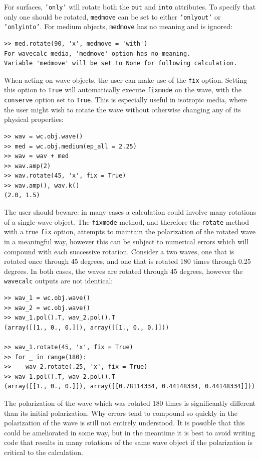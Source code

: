 \documentclass[11pt, reqno]{book}%
\newcounter{ct}
\newcommand{\tw}[1]{{\tt #1}}
\begin{document}
\noindent For surfaces, \tw{'only'} will rotate both the \tw{out} and \tw{into} attributes. To specify that only one should be rotated, \tw{medmove} can be set to either \tw{'onlyout'} or \tw{'onlyinto'}. For medium objects, \tw{medmove} has no meaning and is ignored:
\begin{verbatim}
>> med.rotate(90, 'x', medmove = 'with')
For wavecalc media, 'medmove' option has no meaning. 
Variable 'medmove' will be set to None for following calculation.
\end{verbatim}
\noindent When acting on wave objects, the user can make use of the \tw{fix} option. Setting this option to \tw{True} will automatically execute \tw{fixmode} on the wave, with the \tw{conserve} option set to \tw{True}. This is especially useful in isotropic media, where the user might wish to rotate the wave without otherwise changing any of its physical properties:
\begin{verbatim}
>> wav = wc.obj.wave()
>> med = wc.obj.medium(ep_all = 2.25)
>> wav = wav + med
>> wav.amp(2)
>> wav.rotate(45, 'x', fix = True)
>> wav.amp(), wav.k()
(2.0, 1.5)
\end{verbatim}
\noindent The user should beware: in many cases a calculation could involve many rotations of a single wave object. The \tw{fixmode} method, and therefore the \tw{rotate} method with a true \tw{fix} option, attempts to maintain the polarization of the rotated wave in a meaningful way, however this can be subject to numerical errors which will compound with each successive rotation. Consider a two waves, one that is rotated once through 45 degrees, and one that is rotated 180 times through 0.25 degrees. In both cases, the waves are rotated through 45 degrees, however the \tw{wavecalc} outputs are not identical:  
\begin{verbatim}
>> wav_1 = wc.obj.wave()
>> wav_2 = wc.obj.wave()
>> wav_1.pol().T, wav_2.pol().T
(array([[1., 0., 0.]]), array([[1., 0., 0.]]))

>> wav_1.rotate(45, 'x', fix = True)
>> for _ in range(180):
>>    wav_2.rotate(.25, 'x', fix = True)
>> wav_1.pol().T, wav_2.pol().T 
(array([[1., 0., 0.]]), array([[0.78114334, 0.44148334, 0.44148334]]))
\end{verbatim}
\noindent The polarization of the wave which was rotated 180 times is significantly different than its initial polarization. Why errors tend to compound so quickly in the polarization of the wave is still not entirely understood. It is possible that this could be ameliorated in some way, but in the meantime it is best to avoid writing code that results in many rotations of the same wave object if the polarization is critical to the calculation. 
\end{document}
